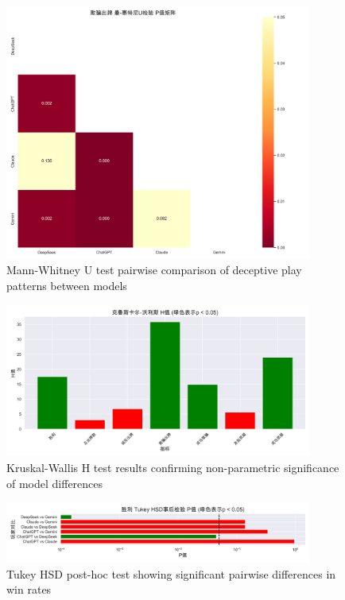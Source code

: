 \documentclass{article}
\begin{document}
\begin{figure}[H]
    \centering
    \includegraphics[width=0.9\textwidth]{figures/mannwhitney_deceptive_plays.png}
    \caption{Mann-Whitney U test pairwise comparison of deceptive play patterns between models}
    \label{fig:mannwhitney_deception}
\end{figure}

\begin{figure}[H]
    \centering
    \includegraphics[width=0.9\textwidth]{figures/kruskal_results.png}
    \caption{Kruskal-Wallis H test results confirming non-parametric significance of model differences}
    \label{fig:kruskal_results}
\end{figure}

\begin{figure}[H]
    \centering
    \includegraphics[width=0.9\textwidth]{figures/tukey_win.png}
    \caption{Tukey HSD post-hoc test showing significant pairwise differences in win rates}
    \label{fig:tukey_win}
\end{figure}
\end{document}
